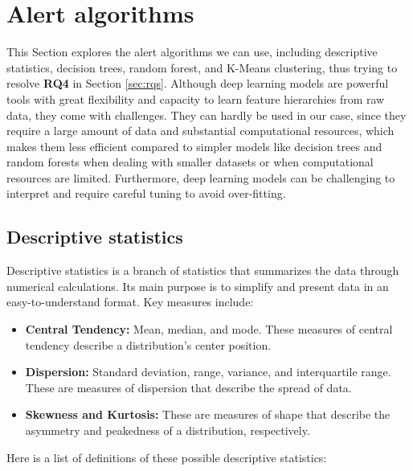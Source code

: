 \section{Alert algorithms}
This Section explores the alert algorithms we can use, including descriptive statistics, decision trees, random forest, and K-Means clustering, thus trying to resolve \textbf{RQ4} in Section \ref{sec:rqs}. Although deep learning models are powerful tools with great flexibility and capacity to learn feature hierarchies from raw data, they come with challenges. They can hardly be used in our case, since they require a large amount of data and substantial computational resources, which makes them less efficient compared to simpler models like decision trees and random forests when dealing with smaller datasets or when computational resources are limited. Furthermore, deep learning models can be challenging to interpret and require careful tuning to avoid over-fitting.

\subsection{Descriptive statistics}
\label{subsec:statistics}
Descriptive statistics is a branch of statistics that summarizes the data through numerical calculations. Its main purpose is to simplify and present data in an easy-to-understand format. Key measures include:

\begin{itemize}
\item \textbf{Central Tendency:} Mean, median, and mode. These measures of central tendency describe a distribution's center position.
\item \textbf{Dispersion:} Standard deviation, range, variance, and interquartile range. These are measures of dispersion that describe the spread of data.
\item \textbf{Skewness and Kurtosis:} These are measures of shape that describe the asymmetry and peakedness of a distribution, respectively.
\end{itemize}

Here is a list of definitions of these possible descriptive statistics:

